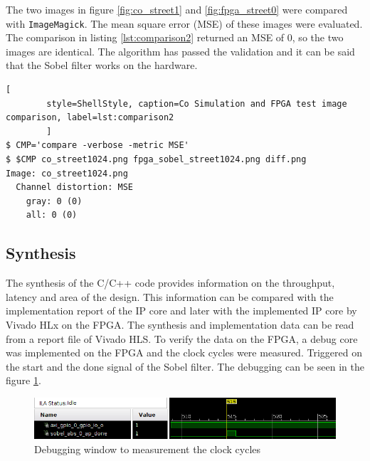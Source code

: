 The two images in figure \ref{fig:co_street1} and \ref{fig:fpga_street0} were compared with \texttt{ImageMagick}. The mean square error (MSE) of these images were evaluated. The comparison in listing \ref{lst:comparison2} returned an MSE of 0, so the two images are identical. The algorithm has passed the validation and it can be said that the Sobel filter works on the hardware.

\begin{minipage}{\linewidth}
\vspace{1ex}
    \begin{lstlisting}[
        style=ShellStyle, caption=Co Simulation and FPGA test image comparison, label=lst:comparison2
        ]
$ CMP='compare -verbose -metric MSE'
$ $CMP co_street1024.png fpga_sobel_street1024.png diff.png
Image: co_street1024.png
  Channel distortion: MSE
    gray: 0 (0)
    all: 0 (0)
\end{lstlisting}
\end{minipage}
\vspace{1ex}



%
%
\clearpage
\subsection{Synthesis} \label{sec:synth}

The synthesis of the C/C++ code provides information on the throughput, latency and area of the design. This information can be compared with the implementation report of the IP core and later with the implemented IP core by Vivado HLx on the FPGA. 
The synthesis and implementation data can be read from a report file of Vivado HLS. To verify the data on the FPGA, a debug core was implemented on the FPGA and the clock cycles were measured. Triggered on the start and the done signal of the Sobel filter. The debugging can be seen in the figure \ref{fig:fpga_time}.

\begin{figure}[t!]
    \centering
    \includegraphics[width=\textwidth]{images/validation/fpga_time.png}
    \caption{Debugging window to measurement the clock cycles}
    \label{fig:fpga_time}
\end{figure}

